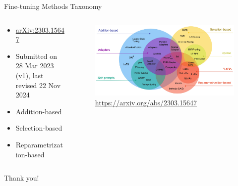 \documentclass[aspectratio=169]{beamer}
\begin{document}


\begin{frame}{Fine-tuning Methods Taxonomy}

  \begin{columns}
    \begin{column}{0.5\textwidth}
      \begin{itemize}
        \setlength\itemsep{1em}
        \item \href{https://arxiv.org/abs/2303.15647}{arXiv:2303.15647}
        \item Submitted on 28 Mar 2023 (v1), last revised 22 Nov 2024
        \item Addition-based
        \item Selection-based
        \item Reparametrization-based
      \end{itemize}
    \end{column}
    \begin{column}{0.5\textwidth}
      \begin{figure}
        \includegraphics[width = \textwidth]{images/fine-tuning-methods-taxonomy.png}
        \caption{\footnotesize \url{https://arxiv.org/abs/2303.15647}}
      \end{figure}
    \end{column}
  \end{columns}

  
\end{frame}


{
  \begin{frame}[plain,c]
    \begin{center}
      \Huge \color[rgb]{1,1,1}Thank you!
    \end{center}
  \end{frame}
}
\end{document}
